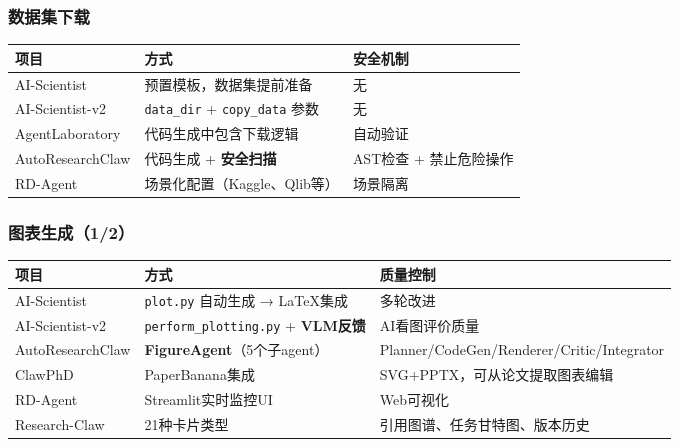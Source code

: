 \documentclass[
  aspectratio=169,
  presentation,
  titlegraphic=./images/bit_logo.pdf,
  framelogo=./images/bit_logo.pdf
]{bitbeamer}
\begin{document}
\begin{frame}[t]
  \frametitle{数据集下载}

  \begin{table}
    \centering
    \small
    \begin{tabular}{p{3.5cm}p{6cm}p{3cm}}
      \toprule
      \textbf{项目} & \textbf{方式} & \textbf{安全机制} \\
      \midrule
      AI-Scientist & 预置模板，数据集提前准备 & 无 \\
      \midrule
      AI-Scientist-v2 & \texttt{data\_dir} + \texttt{copy\_data} 参数 & 无 \\
      \midrule
      AgentLaboratory & 代码生成中包含下载逻辑 & 自动验证 \\
      \midrule
      AutoResearchClaw & 代码生成 + \textbf{安全扫描} & AST检查 + 禁止危险操作 \\
      \midrule
      RD-Agent & 场景化配置（Kaggle、Qlib等） & 场景隔离 \\
      \bottomrule
    \end{tabular}
  \end{table}

\end{frame}

\begin{frame}[t]
  \frametitle{图表生成（1/2）}

  \begin{table}
    \centering
    \tiny
    \begin{tabular}{p{2.8cm}p{4.5cm}p{4.5cm}}
      \toprule
      \textbf{项目} & \textbf{方式} & \textbf{质量控制} \\
      \midrule
      AI-Scientist & \texttt{plot.py} 自动生成 → LaTeX集成 & 多轮改进 \\
      \midrule
      AI-Scientist-v2 & \texttt{perform\_plotting.py} + \textbf{VLM反馈} & AI看图评价质量 \\
      \midrule
      AutoResearchClaw & \textbf{FigureAgent}（5个子agent） & Planner/CodeGen/Renderer/Critic/Integrator \\
      \midrule
      ClawPhD & PaperBanana集成 & SVG+PPTX，可从论文提取图表编辑 \\
      \midrule
      RD-Agent & Streamlit实时监控UI & Web可视化 \\
      \midrule
      Research-Claw & 21种卡片类型 & 引用图谱、任务甘特图、版本历史 \\
      \bottomrule
    \end{tabular}
  \end{table}

\end{frame}
\end{document}
